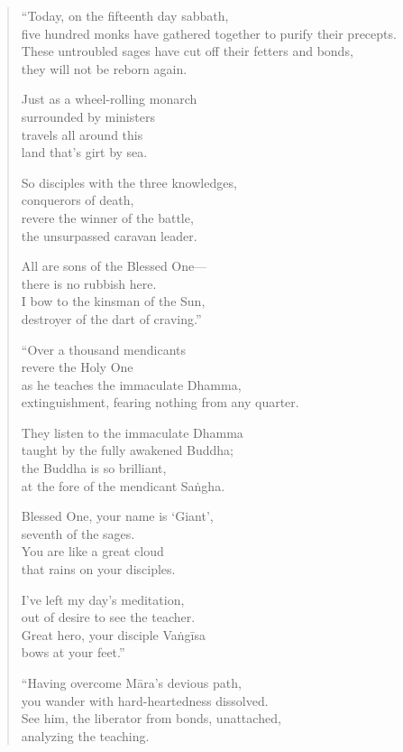 \documentclass[12pt,openany]{book}%
\begin{document}
\begin{verse}
“Today, on the fifteenth day sabbath, \\
five hundred monks have gathered together to purify their precepts. \\
These untroubled sages have cut off their fetters and bonds, \\
they will not be reborn again. 

Just as a wheel-rolling monarch \\
surrounded by ministers \\
travels all around this \\
land that’s girt by sea. 

So disciples with the three knowledges, \\
conquerors of death, \\
revere the winner of the battle, \\
the unsurpassed caravan leader. 

All are sons of the Blessed One—\\
there is no rubbish here. \\
I bow to the kinsman of the Sun, \\
destroyer of the dart of craving.” 

“Over a thousand mendicants \\
revere the Holy One \\
as he teaches the immaculate Dhamma, \\
extinguishment, fearing nothing from any quarter. 

They listen to the immaculate Dhamma \\
taught by the fully awakened Buddha; \\
the Buddha is so brilliant, \\
at the fore of the mendicant \textsanskrit{Saṅgha}. 

Blessed One, your name is ‘Giant’, \\
seventh of the sages. \\
You are like a great cloud \\
that rains on your disciples. 

I’ve left my day’s meditation, \\
out of desire to see the teacher. \\
Great hero, your disciple \textsanskrit{Vaṅgīsa} \\
bows at your feet.” 

“Having overcome \textsanskrit{Māra}’s devious path, \\
you wander with hard-heartedness dissolved. \\
See him, the liberator from bonds, unattached, \\
analyzing the teaching. 


\end{verse}
\end{document}
